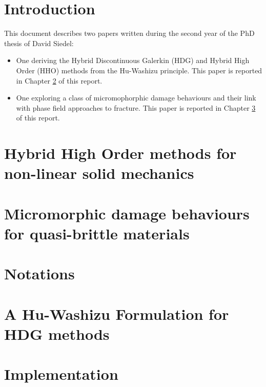 \documentclass[anti,rapport,anglais]{note_technique_2018}
\affiliation{(*) DES/ISAS/DM2S/SEMT/LM2S}
\begin{document}
\chapter{Introduction}

This document describes two papers written during the second year of
the PhD thesis of David Siedel:
\begin{itemize}
  \item One deriving the Hybrid Discontinuous Galerkin (HDG) and
  Hybrid High Order (HHO) methods from the Hu-Washizu principle. This
  paper is reported in Chapter \ref{chapter:hho} of this report.
  \item One exploring a class of micromophorphic damage
  behaviours and their link with phase field approaches to fracture.
  This paper is reported in Chapter \ref{chapter:micromorphic_damage} of
  this report.
\end{itemize}

\chapter{Hybrid High Order methods for non-linear solid mechanics}
\label{chapter:hho}








\chapter{Micromorphic damage behaviours for quasi-brittle materials}
\label{chapter:micromorphic_damage}





\appendix

\chapter{Notations}


\chapter{A Hu-Washizu Formulation for HDG methods}


\chapter{Implementation}





\end{document}
